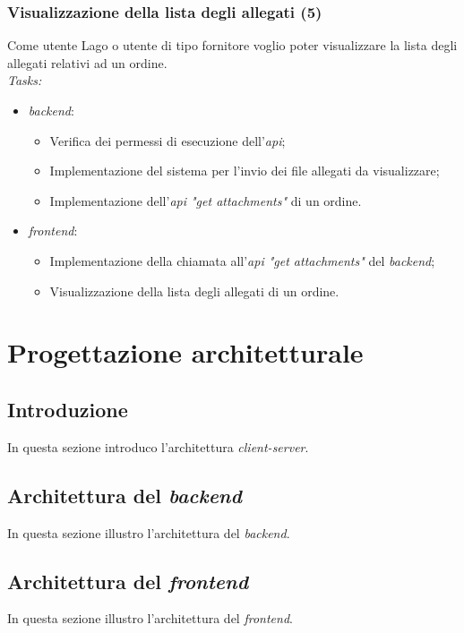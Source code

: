 \subsubsection{Visualizzazione della lista degli allegati (5)}
Come utente Lago o utente di tipo fornitore voglio poter visualizzare la lista degli allegati relativi ad un ordine. \\
\emph{Tasks:}
\begin{itemize}
  \item \emph{\gls{backend}}:
    \begin{itemize}
      \item Verifica dei permessi di esecuzione dell'\emph{\acrshort{api}};
      \item Implementazione del sistema per l'invio dei file allegati da visualizzare;
      \item Implementazione dell'\emph{\acrshort{api} "get attachments"} di un ordine.
    \end{itemize}
  \item \emph{\gls{frontend}}:
    \begin{itemize}
      \item Implementazione della chiamata all'\emph{\acrshort{api} "get attachments"} del \emph{\gls{backend}};
      \item Visualizzazione della lista degli allegati di un ordine.
    \end{itemize}
\end{itemize}

\section{Progettazione architetturale}

\subsection{Introduzione}
In questa sezione introduco l'architettura \emph{client-server}.

\subsection{Architettura del \emph{backend}}
In questa sezione illustro l'architettura del \emph{backend}.

\subsection{Architettura del \emph{frontend}}
In questa sezione illustro l'architettura del \emph{frontend}.

